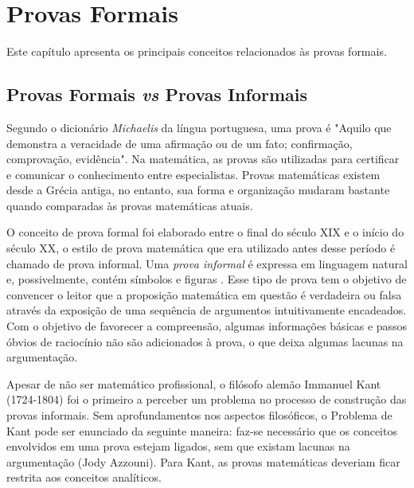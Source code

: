
\chapter{Provas Formais}

Este capítulo apresenta os principais conceitos relacionados às provas formais.

\section{Provas Formais \textit{vs} Provas Informais}

Segundo o dicionário \textit{Michaelis} da língua portuguesa, uma prova é "Aquilo que demonstra a veracidade de uma afirmação ou de um fato; confirmação, comprovação, evidência". Na matemática, as provas são utilizadas para certificar e comunicar o conhecimento entre especialistas. Provas matemáticas existem desde a Grécia antiga, no entanto, sua forma e organização mudaram bastante quando comparadas às provas matemáticas atuais.

O conceito de prova formal foi elaborado entre o final do século XIX e o início do século XX, o estilo de prova matemática que era utilizado antes desse período é chamado de prova informal. Uma \textit{prova informal} é expressa em linguagem natural e, possivelmente, contém símbolos e figuras \cite{1}. Esse tipo de prova tem o objetivo de convencer o leitor que a proposição matemática em questão é verdadeira ou falsa através da exposição de uma sequência de argumentos intuitivamente encadeados. Com o objetivo de favorecer a compreensão, algumas informações básicas e passos óbvios de raciocínio não são adicionados à prova, o que deixa algumas lacunas na argumentação.

Apesar de não ser matemático profissional, o filósofo alemão Immanuel Kant (1724-1804) foi o primeiro a perceber um problema no processo de construção das provas informais. Sem aprofundamentos nos aspectos filosóficos, o Problema de Kant pode ser enunciado da seguinte maneira: faz-se necessário que os conceitos envolvidos em uma prova estejam ligados, sem que existam lacunas na argumentação (Jody Azzouni). Para Kant, as provas matemáticas deveriam ficar restrita aos conceitos analíticos.